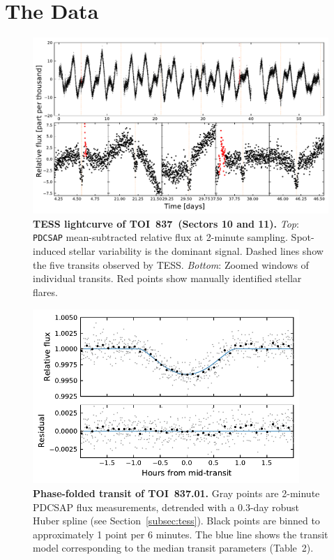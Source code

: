 \documentclass[12pt,twocolumn,tighten]{aastex62}
\newcommand{\tn}{TOI~837} %
\newcommand{\pn}{TOI~837.01} %
\begin{document}
\section{The Data}
\label{sec:observations}

\begin{figure}[t!]
	\begin{center}
		\leavevmode
		\includegraphics[width=1\textwidth]{f1.pdf}
	\end{center}
	\vspace{-0.7cm}
	\caption{
    {\bf TESS lightcurve of \tn\ (Sectors 10 and 11).}
    {\it Top}: \texttt{PDCSAP} mean-subtracted relative flux at
    2-minute sampling. Spot-induced stellar variability is the
    dominant signal.  Dashed lines show the five transits observed by
    TESS.
    {\it Bottom}: Zoomed windows of individual transits.  Red points
    show manually identified stellar flares.
		\label{fig:rawzoom}
	}
\end{figure}

\begin{figure}[t!]
	\begin{center}
		\leavevmode
		\includegraphics[width=0.9\textwidth]{f2.pdf}
	\end{center}
	\vspace{-0.7cm}
	\caption{
    {\bf Phase-folded transit of \pn.} Gray points are
    2-minute PDCSAP flux measurements, detrended with
    a 0.3-day robust Huber spline (see Section~\ref{subsec:tess}).
    Black points are binned to approximately 1 point per 6 minutes.
    The blue line shows the transit model corresponding to the median
    transit parameters (Table~2).
    \label{fig:phasefold}
	}
\end{figure}
\end{document}
